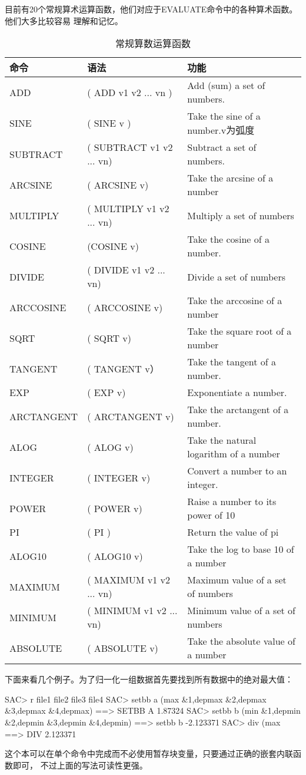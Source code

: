 目前有20个常规算术运算函数，他们对应于EVALUATE命令中的各种算术函数。他们大多比较容易
理解和记忆。
\begin{table}[h]
\caption{常规算数运算函数}
\centering
\begin{tabular}{l|l|l}
	\toprule
	命令	&	语法	&	功能	\\
	\midrule
	ADD		&	( ADD v1 v2 ... vn )	&	Add (sum) a set of numbers.	\\
	SINE	&	( SINE v )				&	Take the sine of a number.v为弧度\\
	SUBTRACT&	( SUBTRACT v1 v2 ... vn)&	Subtract a set of numbers.	\\
	ARCSINE	&	( ARCSINE v)			&	Take the arcsine of a number	\\
	MULTIPLY&	( MULTIPLY v1 v2 ... vn)&	Multiply a set of numbers	\\
	COSINE	&	(COSINE v)				&	Take the cosine of a number.	\\
	DIVIDE	&	( DIVIDE v1 v2 ... vn)	&	Divide a set of numbers	\\
	ARCCOSINE&	( ARCCOSINE v) 			&	Take the arccosine of a number	\\
	SQRT	&	( SQRT v) 				&	Take the square root of a number	\\
	TANGENT	&	( TANGENT v）			&	Take the tangent of a number.	\\
	EXP 	&	( EXP v)				&	Exponentiate a number.	\\
	ARCTANGENT&	( ARCTANGENT v)			&	Take the arctangent of a number.	\\
	ALOG	&	( ALOG v)				&	Take the natural logarithm of a number	\\
	INTEGER &	( INTEGER v)			&	Convert a number to an integer.	\\
	POWER	&	( POWER v)				&	Raise a number to its power of 10	\\
	PI		&	( PI )					&	Return the value of pi	\\
	ALOG10	&	( ALOG10 v)				&	Take the log to base 10 of a number	\\
	MAXIMUM	&	( MAXIMUM v1 v2 ... vn)	&	Maximum value of a set of numbers	\\
	MINIMUM	&	( MINIMUM v1 v2 ... vn)	&	Minimum value of a set of numbers	\\
	ABSOLUTE&	( ABSOLUTE v)			&	Take the absolute value of a number	\\
	\bottomrule
\end{tabular}
\end{table}

下面来看几个例子。为了归一化一组数据首先要找到所有数据中的绝对最大值：
\begin{SACCode}
SAC> r file1 file2 file3 file4
SAC> setbb a (max &1,depmax &2,depmax &3,depmax &4,depmax)
 ==> SETBB A 1.87324
SAC> setbb b (min &1,depmin &2,depmin &3,depmin &4,depmin)
 ==> setbb b -2.123371
SAC> div (max %
 ==> DIV 2.123371 
\end{SACCode}
这个本可以在单个命令中完成而不必使用暂存块变量，只要通过正确的嵌套内联函数即可，
不过上面的写法可读性更强。

